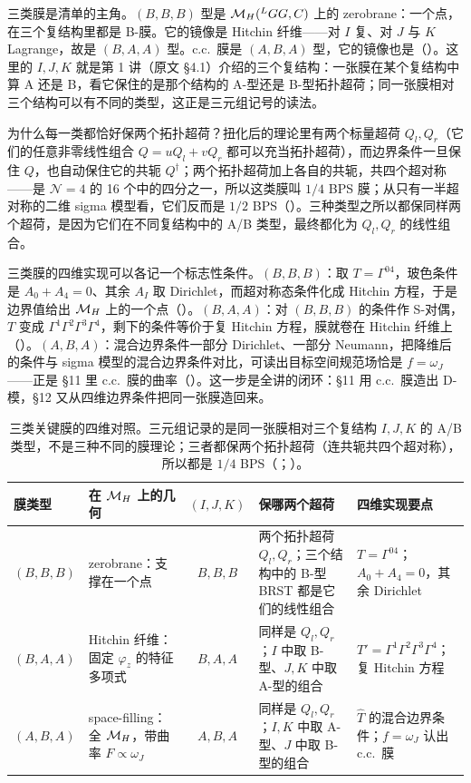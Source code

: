 三类膜是清单的主角。$(B,B,B)$ 型是 $\mathcal{M}_{H}({}^{L}G G,C)$ 上的 zerobrane：一个点，在三个复结构里都是 B-膜。它的镜像是 Hitchin 纤维——对 $I$ 复、对 $J$ 与 $K$ Lagrange，故是 $(B,A,A)$ 型。c.c.\ 膜是 $(A,B,A)$ 型，它的镜像也是（）。这里的 $I,J,K$ 就是第 1 讲（原文 §4.1）介绍的三个复结构：一张膜在某个复结构中算 A 还是 B，看它保住的是那个结构的 A-型还是 B-型拓扑超荷；同一张膜相对三个结构可以有不同的类型，这正是三元组记号的读法。

为什么每一类都恰好保两个拓扑超荷？扭化后的理论里有两个标量超荷 $Q_l,Q_r$（它们的任意非零线性组合 $Q=uQ_l+vQ_r$ 都可以充当拓扑超荷），而边界条件一旦保住 $Q$，也自动保住它的共轭 $Q^\dagger$；两个拓扑超荷加上各自的共轭，共四个超对称——是 $\mathcal N=4$ 的 16 个中的四分之一，所以这类膜叫 $1/4$ BPS 膜；从只有一半超对称的二维 sigma 模型看，它们反而是 $1/2$ BPS（）。三种类型之所以都保同样两个超荷，是因为它们在不同复结构中的 A/B 类型，最终都化为 $Q_l,Q_r$ 的线性组合。

三类膜的四维实现可以各记一个标志性条件。$(B,B,B)$：取 $T=\Gamma^{04}$，玻色条件是 $A_0+A_4=0$、其余 $A_I$ 取 Dirichlet，而超对称态条件化成 Hitchin 方程，于是边界值给出 $\mathcal{M}_{H}$ 上的一个点（）。$(B,A,A)$：对 $(B,B,B)$ 的条件作 S-对偶，$T$ 变成 $\Gamma^1\Gamma^2\Gamma^3\Gamma^4$，剩下的条件等价于复 Hitchin 方程，膜就卷在 Hitchin 纤维上（）。$(A,B,A)$：混合边界条件一部分 Dirichlet、一部分 Neumann，把降维后的条件与 sigma 模型的混合边界条件对比，可读出目标空间规范场恰是 $f=\omega_J$——正是 \S11 里 c.c.\ 膜的曲率（）。这一步是全讲的闭环：\S11 用 c.c.\ 膜造出 D-模，\S12 又从四维边界条件把同一张膜造回来。

\begin{table}[htbp]
\centering
\footnotesize
\begin{tabular}{@{}l p{} c p{} p{}@{}}
\toprule
膜类型 & 在 $\mathcal{M}_{H}$ 上的几何 & $(I,J,K)$ & 保哪两个超荷 & 四维实现要点 \\
\midrule
$(B,B,B)$ & zerobrane：支撑在一个点 & $B,B,B$ &
两个拓扑超荷 $Q_l,Q_r$；三个结构中的 B-型 BRST 都是它们的线性组合 &
$T=\Gamma^{04}$；$A_0+A_4=0$，其余 Dirichlet \\
$(B,A,A)$ & Hitchin 纤维：固定 $\varphi_z$ 的特征多项式 & $B,A,A$ &
同样是 $Q_l,Q_r$；$I$ 中取 B-型、$J,K$ 中取 A-型的组合 &
$T'=\Gamma^{1}\Gamma^{2}\Gamma^{3}\Gamma^{4}$；复 Hitchin 方程 \\
$(A,B,A)$ & space-filling：全 $\mathcal{M}_{H}$，带曲率 $F\propto\omega_J$ & $A,B,A$ &
同样是 $Q_l,Q_r$；$I,K$ 中取 A-型、$J$ 中取 B-型的组合 &
$\hat T$ 的混合边界条件；$f=\omega_J$ 认出 c.c.\ 膜 \\
\bottomrule
\end{tabular}
\caption{三类关键膜的四维对照。三元组记录的是同一张膜相对三个复结构 $I,J,K$ 的 A/B 类型，不是三种不同的膜理论；三者都保两个拓扑超荷（连共轭共四个超对称），所以都是 $1/4$ BPS（；）。}
\label{tab:three-branes}
\end{table}

